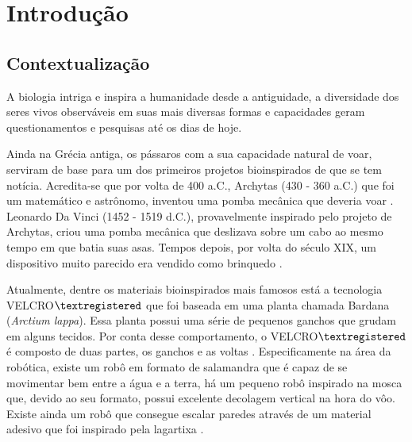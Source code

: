 \documentclass[
	12pt,				%
	openright,			%
	oneside,			%
	a4paper,			%
	english,			%
	brazil				%
	]{abntex2}
\begin{document}
\chapter{Introdução} %
		
		\section{Contextualização}


		A biologia intriga e inspira a humanidade desde a antiguidade, a diversidade dos seres vivos observáveis em suas mais diversas formas e capacidades geram questionamentos e pesquisas até os dias de hoje. 

		Ainda na Grécia antiga, os pássaros com a sua capacidade natural de voar, serviram de base para um dos primeiros projetos bioinspirados de que se tem notícia. Acredita-se que por volta de 400 a.C., Archytas (430 - 360 a.C.) que foi um matemático e astrônomo, inventou uma pomba mecânica que deveria voar \cite{livingstone2014greece}. Leonardo Da Vinci (1452 - 1519 d.C.), provavelmente inspirado pelo projeto de Archytas, criou uma pomba mecânica que deslizava sobre um cabo ao mesmo tempo em que batia suas asas. Tempos depois, por volta do século XIX, um dispositivo muito parecido era vendido como brinquedo \cite{rosheim2006leonardo}.

		Atualmente, dentre os materiais bioinspirados mais famosos está a tecnologia VELCRO${\textregistered}$ que foi baseada em uma planta chamada Bardana (\textit{Arctium lappa}). Essa planta possui uma série de pequenos ganchos que grudam em alguns tecidos. Por conta desse comportamento, o VELCRO${\textregistered}$ é composto de duas partes, os ganchos e as voltas \cite{velcro2019about}. Especificamente na área da robótica, existe um robô em formato de salamandra que é capaz de se movimentar bem entre a água e a terra, há um pequeno robô inspirado na mosca que, devido ao seu formato, possui excelente decolagem vertical na hora do vôo. Existe ainda um robô que consegue escalar paredes através de um material adesivo que foi inspirado pela lagartixa \cite{pfeifer2007biorobot}. 
\end{document}
